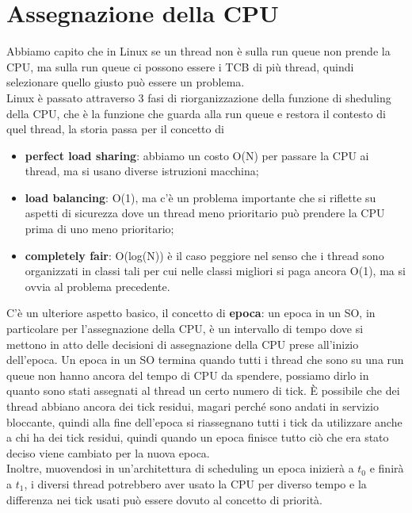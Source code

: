 \documentclass[12pt, oneside]{extbook}
\begin{document}
\section{Assegnazione della CPU}
Abbiamo capito che in Linux se un thread non è sulla run queue non prende la CPU, ma sulla run queue ci possono essere i TCB di più thread, quindi selezionare quello giusto può essere un problema.\\Linux è passato attraverso 3 fasi di riorganizzazione della funzione di sheduling della CPU, che è la funzione che guarda alla run queue e restora il contesto di quel thread, la storia passa per il concetto di
\begin{itemize}
\item \textbf{perfect load sharing}: abbiamo un costo O(N) per passare la CPU ai thread, ma si usano diverse istruzioni macchina;
\item \textbf{load balancing}: O(1), ma c'è un problema importante che si riflette su aspetti di sicurezza dove un thread meno prioritario può prendere la CPU prima di uno meno prioritario;
\item \textbf{completely fair}: O(log(N)) è il caso peggiore nel senso che i thread sono organizzati in classi tali per cui nelle classi migliori si paga ancora O(1), ma si ovvia al problema precedente.
\end{itemize}
C'è un ulteriore aspetto basico, il concetto di \textbf{epoca}: un epoca in un SO, in particolare per l'assegnazione della CPU, è un intervallo di tempo dove si mettono in atto delle decisioni di assegnazione della CPU prese all'inizio dell'epoca. Un epoca in un SO termina quando tutti i thread che sono su una run queue non hanno ancora del tempo di CPU da spendere, possiamo dirlo in quanto sono stati assegnati al thread un certo numero di tick. È possibile che dei thread abbiano ancora dei tick residui, magari perché sono andati in servizio bloccante, quindi alla fine dell'epoca si riassegnano tutti i tick da utilizzare anche a chi ha dei tick residui, quindi quando un epoca finisce tutto ciò che era stato deciso viene cambiato per la nuova epoca.\\Inoltre, muovendosi in un'architettura di scheduling un epoca inizierà a $t_0$ e finirà a $t_1$, i diversi thread potrebbero aver usato la CPU per diverso tempo e la differenza nei tick usati può essere dovuto al concetto di priorità.
\end{document}
